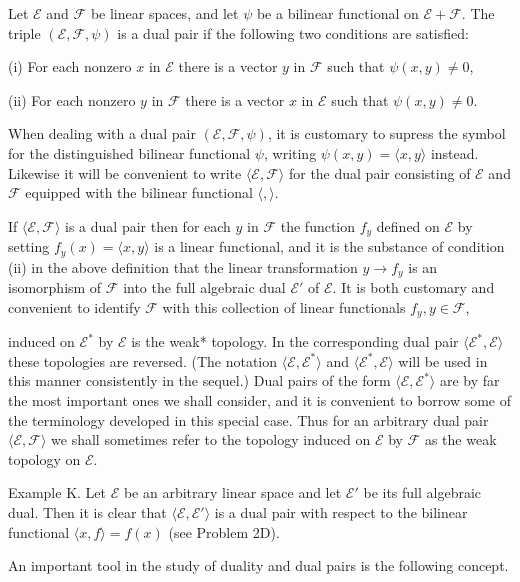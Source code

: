 Let $\mathcal{E}$ and $\mathcal{F}$ be linear spaces, and let $\psi$ be a bilinear functional on $\mathcal{E} + \mathcal{F}$. The triple $(\mathcal{E}, \mathcal{F}, \psi)$ is a dual pair if the following two conditions are satisfied:

(i) For each nonzero $x$ in $\mathcal{E}$ there is a vector $y$ in $\mathcal{F}$ such that $\psi(x, y) \neq 0$,

(ii) For each nonzero $y$ in $\mathcal{F}$ there is a vector $x$ in $\mathcal{E}$ such that $\psi(x, y) \neq 0$.

When dealing with a dual pair $(\mathcal{E}, \mathcal{F}, \psi)$, it is customary to supress the symbol for the distinguished bilinear functional $\psi$, writing $\psi(x, y) = \langle x, y \rangle$ instead. Likewise it will be convenient to write $\langle \mathcal{E}, \mathcal{F} \rangle$ for the dual pair consisting of $\mathcal{E}$ and $\mathcal{F}$ equipped with the bilinear functional $\langle , \rangle$.

If $\langle \mathcal{E}, \mathcal{F} \rangle$ is a dual pair then for each $y$ in $\mathcal{F}$ the function $f_y$ defined on $\mathcal{E}$ by setting $f_y(x) = \langle x, y \rangle$ is a linear functional, and it is the substance of condition (ii) in the above definition that the linear transformation $y \rightarrow f_y$ is an isomorphism of $\mathcal{F}$ into the full algebraic dual $\mathcal{E}'$ of $\mathcal{E}$. It is both customary and convenient to identify $\mathcal{F}$ with this collection of linear functionals $f_y, y \in \mathcal{F}$,

induced on $\mathcal{E}^*$ by $\mathcal{E}$ is the weak* topology. In the corresponding dual pair $\langle \mathcal{E}^*, \mathcal{E} \rangle$ these topologies are reversed. (The notation $\langle \mathcal{E}, \mathcal{E}^* \rangle$ and $\langle \mathcal{E}^*, \mathcal{E} \rangle$ will be used in this manner consistently in the sequel.) Dual pairs of the form $\langle \mathcal{E}, \mathcal{E}^* \rangle$ are by far the most important ones we shall consider, and it is convenient to borrow some of the terminology developed in this special case. Thus for an arbitrary dual pair $\langle \mathcal{E}, \mathcal{F} \rangle$ we shall sometimes refer to the topology induced on $\mathcal{E}$ by $\mathcal{F}$ as the weak topology on $\mathcal{E}$.

Example K. Let $\mathcal{E}$ be an arbitrary linear space and let $\mathcal{E}'$ be its full algebraic dual. Then it is clear that $\langle \mathcal{E}, \mathcal{E}' \rangle$ is a dual pair with respect to the bilinear functional $\langle x, f \rangle = f(x)$ (see Problem 2D).

An important tool in the study of duality and dual pairs is the following concept.
